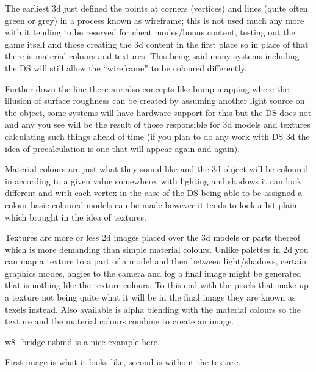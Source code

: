 \documentclass[
]{book}
\begin{document}
The earliest 3d just defined the points at corners (vertices) and lines (quite often green or grey) in a process known as wireframe; this is not used much any more with it tending to be reserved for cheat modes/bonus content, testing out the game itself and those creating the 3d content in the first place so in place of that there is material colours and textures. This being said many systems including the DS will still allow the ``wireframe'' to be coloured differently.

Further down the line there are also concepts like bump mapping where the illusion of surface roughness can be created by assuming another light source on the object, some systems will have hardware support for this but the DS does not and any you see will be the result of those responsible for 3d models and textures calculating such things ahead of time (if you plan to do any work with DS 3d the idea of precalculation is one that will appear again and again).

Material colours are just what they sound like and the 3d object will be coloured in according to a given value somewhere, with lighting and shadows it can look different and with each vertex in the case of the DS being able to be assigned a colour basic coloured models can be made however it tends to look a bit plain which brought in the idea of textures.

Textures are more or less 2d images placed over the 3d models or parts thereof which is more demanding than simple material colours. Unlike palettes in 2d you can map a texture to a part of a model and then between light/shadows, certain graphics modes, angles to the camera and fog a final image might be generated that is nothing like the texture colours. To this end with the pixels that make up a texture not being quite what it will be in the final image they are known as texels instead. Also available is alpha blending with the material colours so the texture and the material colours combine to create an image.

w8\_bridge.nsbmd is a nice example here.

First image is what it looks like, second is without the texture.
\end{document}
